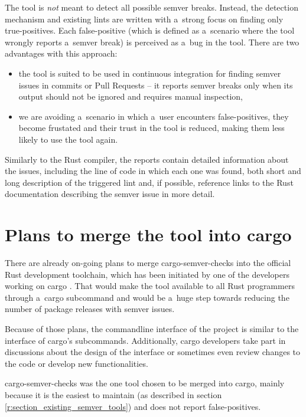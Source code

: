 \documentclass[licencjacka,en]{pracamgr}
\begin{document}
The tool is \textit{not} meant to detect all possible semver breaks. Instead, the detection
mechanism and existing lints are written with a~strong focus on finding only true-positives.
Each false-positive (which is defined as a~scenario where the tool wrongly reports a~semver break)
is perceived as a~bug in the tool. There are two advantages with this approach:
\begin{itemize}
	\item the tool is suited to be used in continuous integration for finding semver issues in
		commits or Pull Requests -- it reports semver breaks only when its output should not be
		ignored and requires manual inspection,
	\item we are avoiding a~scenario in which a~user encounters false-positives, they become
		frustated and their trust in the tool is reduced, making them less likely to use the
		tool again.
\end{itemize}

Similarly to the Rust compiler, the reports contain detailed information about the issues,
including the line of code in which each one was found, both short and long description of the
triggered lint and, if possible, reference links to the Rust documentation describing the semver
issue in more detail.

\section{Plans to merge the tool into cargo}\label{r:section_merge_into_cargo_plans}

There are already on-going plans to merge cargo-semver-checks into the official Rust development
toolchain, which has been initiated by one of the developers working on cargo
\cite{issue-merge-cargo}. That would make the tool available to all Rust programmers through
a~cargo subcommand and would be a~huge step towards reducing the number of package releases with
semver issues.

Because of those plans, the commandline interface of the project is similar to the interface of
cargo's subcommands. Additionally, cargo developers take part in discussions about the design of
the interface \cite{issue-cli-interface} or sometimes even review changes to the code or develop
new functionalities.

cargo-semver-checks was the one tool chosen to be merged into cargo, mainly because it is the
easiest to maintain (as described in section \ref{r:section_existing_semver_tools}) and does not
report false-positives.
\end{document}
